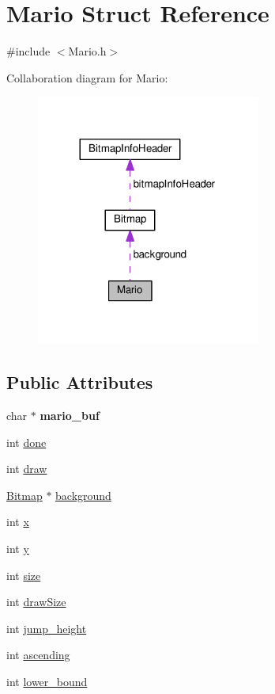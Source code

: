 \hypertarget{structMario}{}\section{Mario Struct Reference}
\label{structMario}


{\ttfamily \#include $<$Mario.\+h$>$}



Collaboration diagram for Mario\+:\nopagebreak
\begin{figure}[H]
\begin{center}
\leavevmode
\includegraphics[width=209pt]{structMario__coll__graph}
\end{center}
\end{figure}
\subsection*{Public Attributes}
\begin{DoxyCompactItemize}
\item 
char $\ast$ {\bfseries mario\+\_\+buf}\hypertarget{structMario_a87ef03068e4b27222a4382f16d6737cd}{}\label{structMario_a87ef03068e4b27222a4382f16d6737cd}

\item 
int \hyperlink{structMario_ac356a194a42781bd6860663fda999834}{done}
\item 
int \hyperlink{structMario_a9c9f2d2e801d1680b64dfa627c713042}{draw}
\item 
\hyperlink{structBitmap}{Bitmap} $\ast$ \hyperlink{structMario_a6e36b388e2610cb9af195f05a5e0d93a}{background}
\item 
int \hyperlink{structMario_ac2d3305a2cc90782a8d37379ba6cdf7b}{x}
\item 
int \hyperlink{structMario_aaf89af6928473a3413248355270bf064}{y}
\item 
int \hyperlink{structMario_ac8a021d67049cc6c3a58892cbf3a16f9}{size}
\item 
int \hyperlink{structMario_a25bf8be536577d81da72c7272090ade7}{draw\+Size}
\item 
int \hyperlink{structMario_afd661aa7602503cbf9a4d33459627e91}{jump\+\_\+height}
\item 
int \hyperlink{structMario_aa915b2e693536ff0d976983a33c51675}{ascending}
\item 
int \hyperlink{structMario_afc7f287b9c802a0206696e99856f3ebf}{lower\+\_\+bound}
\end{DoxyCompactItemize}


